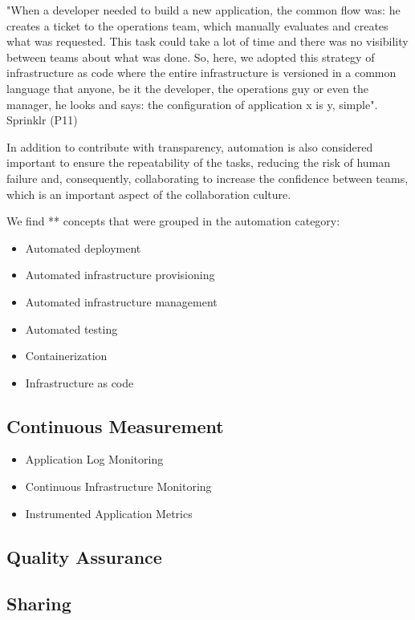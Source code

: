"When a developer needed to build a new application, the common flow was: he creates a ticket to the operations team, which manually evaluates and creates what was requested. This task could take a lot of time and there was no visibility between teams about what was done. So, here, we adopted this strategy of infrastructure as code where the entire infrastructure is versioned in a common language that anyone, be it the developer, the operations guy or even the manager, he looks and says: the configuration of application x is y, simple". Sprinklr (P11)

In addition to contribute with transparency, automation is also considered important to ensure the repeatability of the tasks, reducing the risk of human failure and, consequently, collaborating to increase the confidence between teams, which is an important aspect of the collaboration culture.

We find ** concepts that were grouped in the automation category:

\begin{itemize}
\item Automated deployment
\item Automated infrastructure provisioning
\item Automated infrastructure management
\item Automated testing
\item Containerization
\item Infrastructure as code
\end{itemize}

\subsection{Continuous Measurement}

\begin{itemize}
\item Application Log Monitoring
\item Continuous Infrastructure Monitoring
\item Instrumented Application Metrics
\end{itemize}

\subsection{Quality Assurance}

\subsection{Sharing}

